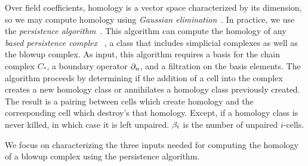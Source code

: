 \documentclass{elsarticle}
\begin{document}
Over field coefficients, homology is a vector space characterized by its dimension, 
so we may compute homology using \emph{Gaussian elimination}~\cite{uhlig}.  
In practice, we use the 
\emph{persistence algorithm}~\cite{elz-tps-02,zc-cph-05}.
This algorithm can compute the homology of any \emph{based persistence complex}
~\cite{zc-lh-08},
a class that includes simplicial complexes as well as the 
blowup complex. As input, this algorithm requires a basis for 
the chain complex $C_*$, a boundary operator $\partial_n$, and a filtration 
on the basis elements. The algorithm proceeds by determining if
the addition of a cell into the complex creates a new homology class
or annihilates a homology class previously created. The result is 
a pairing between cells which create homology and the corresponding
cell which destroy's that homology. Except, if a homology class is never killed, in which case it is left unpaired.
$\beta_i$ is the number of unpaired $i$-cells.

We focus on characterizing the three inputs needed for computing the homology 
of a blowup complex using the persistence algorithm.
\end{document}
